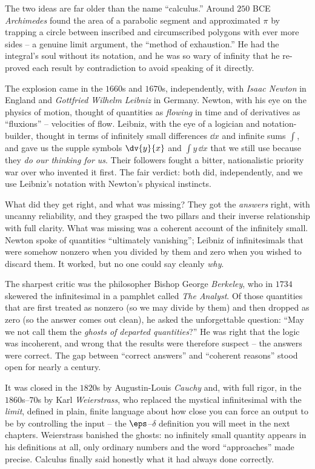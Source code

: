 \begin{historybox}
The two ideas are far older than the name ``calculus.'' Around $250$ BCE
\emph{Archimedes} found the area of a parabolic segment and approximated $\pi$ by
trapping a circle between inscribed and circumscribed polygons with ever more
sides -- a genuine limit argument, the ``method of exhaustion.'' He had the
integral's soul without its notation, and he was so wary of infinity that he
re-proved each result by contradiction to avoid speaking of it directly.

The explosion came in the $1660$s and $1670$s, independently, with \emph{Isaac
Newton} in England and \emph{Gottfried Wilhelm Leibniz} in Germany. Newton, with
his eye on the physics of motion, thought of quantities as \emph{flowing} in time
and of derivatives as ``fluxions'' -- velocities of flow. Leibniz, with the eye
of a logician and notation-builder, thought in terms of infinitely small
differences $\dd x$ and infinite sums $\int$, and gave us the supple symbols
$\dv{y}{x}$ and $\int y\,\dd x$ that we still use because they \emph{do our
thinking for us}. Their followers fought a bitter, nationalistic priority war
over who invented it first. The fair verdict: both did, independently, and we use
Leibniz's notation with Newton's physical instincts.

What did they get right, and what was missing? They got the \emph{answers}
right, with uncanny reliability, and they grasped the two pillars and their
inverse relationship with full clarity. What was missing was a coherent account
of the infinitely small. Newton spoke of quantities ``ultimately vanishing'';
Leibniz of infinitesimals that were somehow nonzero when you divided by them and
zero when you wished to discard them. It worked, but no one could say cleanly
\emph{why}.
\end{historybox}

\begin{historybox}
The sharpest critic was the philosopher Bishop George \emph{Berkeley}, who in
$1734$ skewered the infinitesimal in a pamphlet called \emph{The Analyst}. Of
those quantities that are first treated as nonzero (so we may divide by them) and
then dropped as zero (so the answer comes out clean), he asked the unforgettable
question: ``May we not call them the \emph{ghosts of departed quantities}?'' He
was right that the logic was incoherent, and wrong that the results were
therefore suspect -- the answers were correct. The gap between ``correct
answers'' and ``coherent reasons'' stood open for nearly a century.

It was closed in the $1820$s by Augustin-Louis \emph{Cauchy} and, with full
rigor, in the $1860$s--$70$s by Karl \emph{Weierstrass}, who replaced the
mystical infinitesimal with the \emph{limit}, defined in plain, finite language
about how close you can force an output to be by controlling the input -- the
$\eps$--$\delta$ definition you will meet in the next chapters. Weierstrass
banished the ghosts: no infinitely small quantity appears in his definitions at
all, only ordinary numbers and the word ``approaches'' made precise. Calculus
finally said honestly what it had always done correctly.
\end{historybox}

